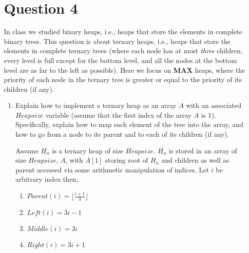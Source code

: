 \documentclass[11pt]{article}
\begin{document}
\section*{Question 4}
In class we studied binary heaps, i.e., heaps that store the elements in complete binary trees. This question is about ternary heaps, i.e., heaps that store the elements in complete ternary trees (where each node has at most \textit{three} children, every level is full except for the bottom level, and all the nodes at the bottom level are as far to the left as possible). Here we focus on \textbf{MAX} heaps, where the priority of each node in the ternary tree is greater or equal to the priority of its children (if any).
\begin{enumerate}
  \item Explain how to implement a ternary heap as an array $A$ with an associated $Heapsize$ variable (assume that the first index of the array $A$ is 1). Specifically, explain how to map each element of the tree into the array, and how to go from a node to its parent and to each of its children (if any).
  \begin{solution}
    Assume $H_n$ is a ternary heap of size $Heapsize$. $H_n$ is stored in an array of size $Heapsize$, $A$, with $A[1]$ storing root of $H_n$ and children as well as parent accessed via some arithmetic manipulation of indices. Let $i$ be arbitrary index then,
    \begin{enumerate}
      \item $Parent(i) = \lfloor \frac{i+1}{3}\rfloor$
      \item $Left(i) = 3i - 1$
      \item $Middle(i) = 3i$
      \item $Right(i) = 3i+1$
    \end{enumerate}
  \end{solution}


\end{enumerate}
\end{document}

